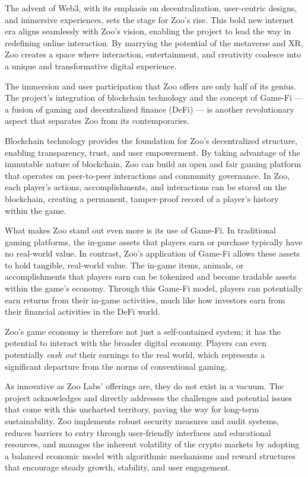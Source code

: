 The advent of Web3, with its emphasis on decentralization, user-centric designs, and immersive experiences, sets the stage for Zoo's rise. This bold new internet era aligns seamlessly with Zoo's vision, enabling the project to lead the way in redefining online interaction. By marrying the potential of the metaverse and XR, Zoo creates a space where interaction, entertainment, and creativity coalesce into a unique and transformative digital experience.

The immersion and user participation that Zoo offers are only half of its genius. The project's integration of blockchain technology and the concept of Game-Fi --- a fusion of gaming and decentralized finance (DeFi) --- is another revolutionary aspect that separates Zoo from its contemporaries.

Blockchain technology provides the foundation for Zoo's decentralized structure, enabling transparency, trust, and user empowerment. By taking advantage of the immutable nature of blockchain, Zoo can build an open and fair gaming platform that operates on peer-to-peer interactions and community governance. In Zoo, each player's actions, accomplishments, and interactions can be stored on the blockchain, creating a permanent, tamper-proof record of a player's history within the game.

What makes Zoo stand out even more is its use of Game-Fi. In traditional gaming platforms, the in-game assets that players earn or purchase typically have no real-world value. In contrast, Zoo's application of Game-Fi allows these assets to hold tangible, real-world value. The in-game items, animals, or accomplishments that players earn can be tokenized and become tradable assets within the game's economy. Through this Game-Fi model, players can potentially earn returns from their in-game activities, much like how investors earn from their financial activities in the DeFi world.

Zoo's game economy is therefore not just a self-contained system; it has the potential to interact with the broader digital economy. Players can even potentially \emph{cash out} their earnings to the real world, which represents a significant departure from the norms of conventional gaming.

As innovative as Zoo Labs' offerings are, they do not exist in a vacuum. The project acknowledges and directly addresses the challenges and potential issues that come with this uncharted territory, paving the way for long-term sustainability. Zoo implements robust security measures and audit systems, reduces barriers to entry through user-friendly interfaces and educational resources, and manages the inherent volatility of the crypto markets by adopting a balanced economic model with algorithmic mechanisms and reward structures that encourage steady growth, stability, and user engagement.

